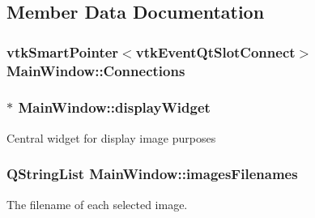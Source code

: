 \subsection{Member Data Documentation}
\hypertarget{class_main_window_a2581229148c6c597849b827689e58a12}{
\subsubsection[{Connections}]{\setlength{\rightskip}{0pt plus 5cm}vtk\-Smart\-Pointer$<$vtk\-Event\-Qt\-Slot\-Connect$>$ {\bf Main\-Window\-::\-Connections}}}\label{d9/dc6/class_main_window_a2581229148c6c597849b827689e58a12}
\hypertarget{class_main_window_a79daf435968c77e526ddf286bcc86a8f}{
\subsubsection[{display\-Widget}]{$\ast$ {\bf Main\-Window\-::display\-Widget}}}\label{d9/dc6/class_main_window_a79daf435968c77e526ddf286bcc86a8f}
Central widget for display image purposes \hypertarget{class_main_window_a8b33f17919e8e99127a612476aefdaed}{
\subsubsection[{images\-Filenames}]{\setlength{\rightskip}{0pt plus 5cm}Q\-String\-List {\bf Main\-Window\-::images\-Filenames}}}\label{d9/dc6/class_main_window_a8b33f17919e8e99127a612476aefdaed}


The filename of each selected image. 

